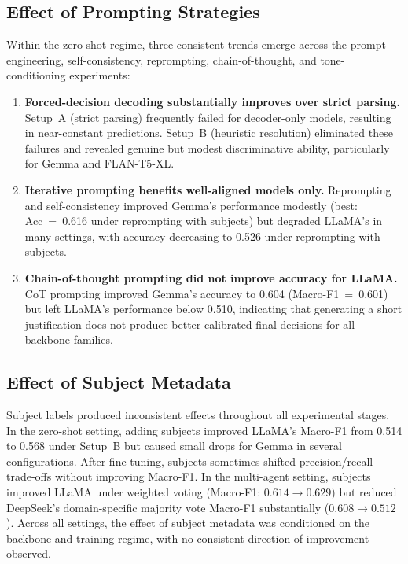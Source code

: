 \subsection{Effect of Prompting Strategies}

Within the zero-shot regime, three consistent trends emerge across the prompt engineering, self-consistency, reprompting, chain-of-thought, and tone-conditioning experiments:

\begin{enumerate}
    \item \textbf{Forced-decision decoding substantially improves 
    over strict parsing.} Setup~A (strict parsing) frequently failed 
    for decoder-only models, resulting in near-constant predictions. 
    Setup~B (heuristic resolution) eliminated these failures and 
    revealed genuine but modest discriminative ability, particularly 
    for Gemma and FLAN-T5-XL.

    \item \textbf{Iterative prompting benefits well-aligned models 
    only.} Reprompting and self-consistency improved Gemma's 
    performance modestly (best: Acc~=~0.616 under reprompting with 
    subjects) but degraded LLaMA's in many settings, with accuracy 
    decreasing to 0.526 under reprompting with subjects.

    \item \textbf{Chain-of-thought prompting did not improve accuracy 
    for LLaMA.} CoT prompting improved Gemma's accuracy to 0.604 
    (Macro-F1~=~0.601) but left LLaMA's performance below 0.510, 
    indicating that generating a short justification does not produce 
    better-calibrated final decisions for all backbone families.
\end{enumerate}

\subsection{Effect of Subject Metadata}

Subject labels produced inconsistent effects throughout all experimental stages. In the zero-shot setting, adding subjects 
improved LLaMA's Macro-F1 from 0.514 to 0.568 under Setup~B but caused small drops for Gemma in several configurations. After 
fine-tuning, subjects sometimes shifted precision/recall trade-offs without improving Macro-F1. In the multi-agent setting, subjects 
improved LLaMA under weighted voting (Macro-F1: $0.614 \to 0.629$) but reduced DeepSeek's domain-specific majority vote Macro-F1 
substantially ($0.608 \to 0.512$). Across all settings, the effect of subject metadata was conditioned on the backbone and training 
regime, with no consistent direction of improvement observed.

